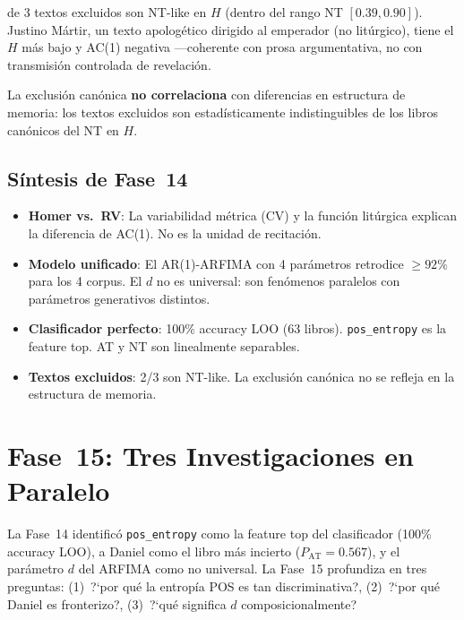 \documentclass[12pt,a4paper]{article}
\begin{document}
 de 3 textos excluidos son NT-like en $H$ (dentro del rango NT $[0.39, 0.90]$).
Justino M\'artir, un texto apolog\'etico dirigido al emperador (no lit\'urgico),
tiene el $H$ m\'as bajo y AC(1) negativa ---coherente con prosa argumentativa,
no con transmisi\'on controlada de revelaci\'on.

La exclusi\'on can\'onica \textbf{no correlaciona} con diferencias en estructura de
memoria: los textos excluidos son estad\'isticamente indistinguibles de los
libros can\'onicos del NT en $H$.

\subsection{S\'intesis de Fase~14}

\begin{itemize}[leftmargin=2em]
\item \textbf{Homer vs.\ RV}: La variabilidad m\'etrica (CV) y la funci\'on
      lit\'urgica explican la diferencia de AC(1). No es la unidad de recitaci\'on.
\item \textbf{Modelo unificado}: El AR(1)-ARFIMA con 4 par\'ametros retrodice
      $\geq 92$\% para los 4 corpus. El $d$ no es universal: son fen\'omenos
      paralelos con par\'ametros generativos distintos.
\item \textbf{Clasificador perfecto}: 100\% accuracy LOO (63 libros).
      \texttt{pos\_entropy} es la feature top. AT y NT son linealmente separables.
\item \textbf{Textos excluidos}: 2/3 son NT-like. La exclusi\'on can\'onica
      no se refleja en la estructura de memoria.
\end{itemize}


\section{Fase~15: Tres Investigaciones en Paralelo}

La Fase~14 identific\'o \texttt{pos\_entropy} como la feature top del clasificador
(100\% accuracy LOO), a Daniel como el libro m\'as incierto ($P_{\text{AT}} = 0.567$),
y el par\'ametro $d$ del ARFIMA como no universal. La Fase~15 profundiza en tres
preguntas: (1)~?`por qu\'e la entrop\'ia POS es tan discriminativa?,
(2)~?`por qu\'e Daniel es fronterizo?, (3)~?`qu\'e significa $d$ composicionalmente?
\end{document}

